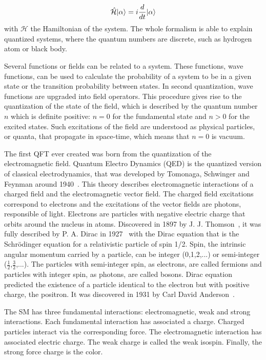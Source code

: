 \begin{equation}
  \label{eq:Schrodinger}
  \hat{\mathcal{H}}| \alpha\rangle=i\frac{d}{dt}| \alpha\rangle
\end{equation}with $\mathcal{H}$ the Hamiltonian of the system. The whole formalism is able to explain quantized systems, where the quantum numbers are discrete, such as hydrogen atom or black body.

Several functions or fields can be related to a system. These functions, wave functions, can be used to calculate the probability of a system to be in a given state or the transition probability between states. In second quantization, wave functions are upgraded into field operators. This procedure gives rise to the quantization of the state of the field, which is described by the quantum number $n$ which is definite positive: $n=0$ for the fundamental state and $n>0$ for the excited states. Such excitations of the field are understood as physical particles, or quanta, that propagate in space-time, which means that $n=0$ is vacuum. 

The first QFT ever created was born from the quantization of the electromagnetic field. Quantum Electro Dynamics (QED) is the quantized version of classical electrodynamics, that was developed by Tomonaga, Schwinger and Feynman around 1940~\cite{Tomonaga:1948zz, Schwinger:1948yk, Feynman:1948ur}. This theory describes electromagnetic interactions of a charged field and the electromagnetic vector field. The charged field excitations correspond to electrons and the excitations of the vector fields are photons, responsible of light. Electrons are particles with negative electric charge that orbits around the nucleus in atoms. Discovered in 1897 by J. J. Thomson~\cite{Thomson:1897cm}, it was fully described by P. A. Dirac in 1927~\cite{Dirac:1927dy} with the Dirac equation that is the Schr\"{o}dinger equation for a relativistic particle of spin 1/2. Spin, the intrinsic angular momentum carried by a particle, can be integer (0,1,2,...) or semi-integer ($\frac{1}{2}$,$\frac{3}{2}$,...). The particles with semi-integer spin, as electrons, are called fermions and particles with integer spin, as photons, are called bosons. Dirac equation predicted the existence of a particle identical to the electron but with positive charge, the positron. It was discovered in 1931 by Carl David Anderson~\cite{Anderson:1933mb}.

The SM has three fundamental interactions: electromagnetic, weak and strong interactions. Each fundamental interaction has associated a charge. Charged particles interact via the corresponding force. The electromagnetic interaction has associated electric charge. The weak charge is called the weak isospin. Finally, the strong force charge is the color.

